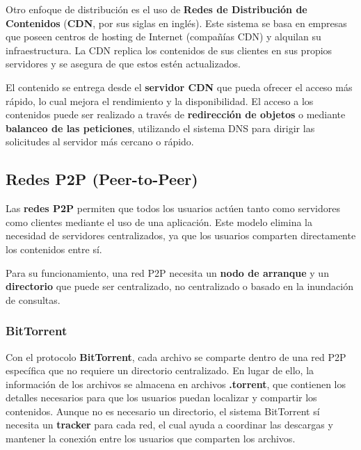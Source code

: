 \documentclass{article}
\begin{document}
Otro enfoque de distribución es el uso de \textbf{Redes de Distribución de Contenidos} (\textbf{CDN}, por sus siglas en inglés). Este sistema se basa en empresas que poseen centros de hosting de Internet (compañías CDN) y alquilan su infraestructura. La CDN replica los contenidos de sus clientes en sus propios servidores y se asegura de que estos estén actualizados. 

El contenido se entrega desde el \textbf{servidor CDN} que pueda ofrecer el acceso más rápido, lo cual mejora el rendimiento y la disponibilidad. El acceso a los contenidos puede ser realizado a través de \textbf{redirección de objetos} o mediante \textbf{balanceo de las peticiones}, utilizando el sistema DNS para dirigir las solicitudes al servidor más cercano o rápido.

\subsection{Redes P2P (Peer-to-Peer)}

Las \textbf{redes P2P} permiten que todos los usuarios actúen tanto como servidores como clientes mediante el uso de una aplicación. Este modelo elimina la necesidad de servidores centralizados, ya que los usuarios comparten directamente los contenidos entre sí.

Para su funcionamiento, una red P2P necesita un \textbf{nodo de arranque} y un \textbf{directorio} que puede ser centralizado, no centralizado o basado en la inundación de consultas.

\subsubsection{BitTorrent}

Con el protocolo \textbf{BitTorrent}, cada archivo se comparte dentro de una red P2P específica que no requiere un directorio centralizado. En lugar de ello, la información de los archivos se almacena en archivos \textbf{.torrent}, que contienen los detalles necesarios para que los usuarios puedan localizar y compartir los contenidos. Aunque no es necesario un directorio, el sistema BitTorrent sí necesita un \textbf{tracker} para cada red, el cual ayuda a coordinar las descargas y mantener la conexión entre los usuarios que comparten los archivos.




\begin{comment}
\begin{figure}[h]
    \centering
    \texttt{[image: 1.png]}
    \caption{}
\end{figure}
\end{comment}

\begin{comment}
\begin{wrapfigure}[]{r}{0.5\linewidth}
    \centering
    \texttt{[image: 8.png]}
    \caption{}
\end{wrapfigure}
\end{comment}
\end{document}
